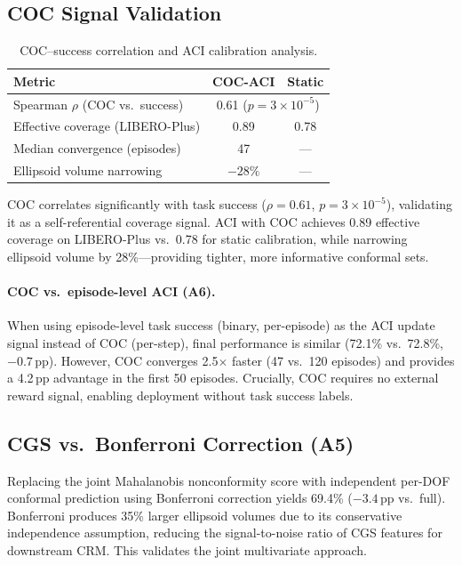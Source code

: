 \documentclass[letterpaper]{article}
\begin{document}
\subsection{COC Signal Validation}

\begin{table}[h]
\centering
\caption{COC--success correlation and ACI calibration analysis.}
\label{tab:coc}
\begin{tabular}{lcc}
\toprule
\textbf{Metric} & \textbf{COC-ACI} & \textbf{Static} \\
\midrule
Spearman $\rho$ (COC vs.\ success) & \multicolumn{2}{c}{0.61 ($p{=}3{\times}10^{-5}$)} \\
Effective coverage (LIBERO-Plus) & 0.89 & 0.78 \\
Median convergence (episodes) & 47 & --- \\
Ellipsoid volume narrowing & $-28\%$ & --- \\
\bottomrule
\end{tabular}
\end{table}

\label{tab:aci}
COC correlates significantly with task success ($\rho{=}0.61$, $p{=}3{\times}10^{-5}$), validating it as a self-referential coverage signal.
ACI with COC achieves 0.89 effective coverage on LIBERO-Plus vs.\ 0.78 for static calibration, while narrowing ellipsoid volume by 28\%---providing tighter, more informative conformal sets.

\paragraph{COC vs.\ episode-level ACI (A6).}
\label{sec:a6}
When using episode-level task success (binary, per-episode) as the ACI update signal instead of COC (per-step), final performance is similar (72.1\% vs.\ 72.8\%, $-0.7$\,pp).
However, COC converges 2.5$\times$ faster (47 vs.\ 120 episodes) and provides a 4.2\,pp advantage in the first 50 episodes.
Crucially, COC requires no external reward signal, enabling deployment without task success labels.

\subsection{CGS vs.\ Bonferroni Correction (A5)}
\label{sec:a5}

Replacing the joint Mahalanobis nonconformity score with independent per-DOF conformal prediction using Bonferroni correction yields 69.4\% ($-3.4$\,pp vs.\ full).
Bonferroni produces 35\% larger ellipsoid volumes due to its conservative independence assumption, reducing the signal-to-noise ratio of CGS features for downstream CRM.
This validates the joint multivariate approach.
\end{document}

